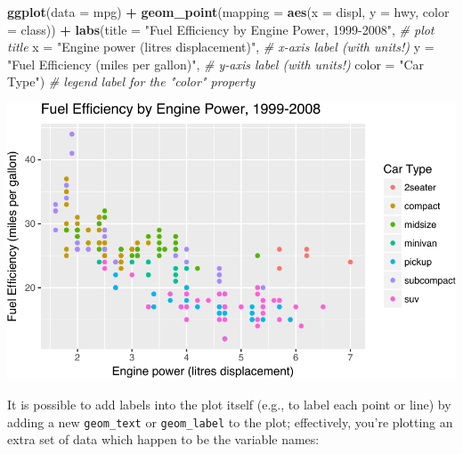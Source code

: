\documentclass[]{book}
\newenvironment{Shaded}{\begin{snugshade}}{\end{snugshade}}
\newcommand{\KeywordTok}[1]{\textcolor[rgb]{0.13,0.29,0.53}{\textbf{#1}}}
\newcommand{\DataTypeTok}[1]{\textcolor[rgb]{0.13,0.29,0.53}{#1}}
\newcommand{\StringTok}[1]{\textcolor[rgb]{0.31,0.60,0.02}{#1}}
\newcommand{\CommentTok}[1]{\textcolor[rgb]{0.56,0.35,0.01}{\textit{#1}}}
\newcommand{\OperatorTok}[1]{\textcolor[rgb]{0.81,0.36,0.00}{\textbf{#1}}}
\newcommand{\NormalTok}[1]{#1}
\theoremstyle{definition}
\theoremstyle{definition}
\theoremstyle{remark}
\begin{document}
\begin{Shaded}
\begin{Highlighting}[]
\KeywordTok{ggplot}\NormalTok{(}\DataTypeTok{data =}\NormalTok{ mpg) }\OperatorTok{+}
\StringTok{  }\KeywordTok{geom_point}\NormalTok{(}\DataTypeTok{mapping =} \KeywordTok{aes}\NormalTok{(}\DataTypeTok{x =}\NormalTok{ displ, }\DataTypeTok{y =}\NormalTok{ hwy, }\DataTypeTok{color =}\NormalTok{ class)) }\OperatorTok{+}
\StringTok{  }\KeywordTok{labs}\NormalTok{(}\DataTypeTok{title =} \StringTok{"Fuel Efficiency by Engine Power, 1999-2008"}\NormalTok{,  }\CommentTok{# plot title}
       \DataTypeTok{x =} \StringTok{"Engine power (litres displacement)"}\NormalTok{,  }\CommentTok{# x-axis label (with units!)}
       \DataTypeTok{y =} \StringTok{"Fuel Efficiency (miles per gallon)"}\NormalTok{,  }\CommentTok{# y-axis label (with units!)}
       \DataTypeTok{color =} \StringTok{"Car Type"}\NormalTok{)  }\CommentTok{# legend label for the "color" property}
\end{Highlighting}
\end{Shaded}

\includegraphics{img/ggplot2/labels-1.pdf}

It is possible to add labels into the plot itself (e.g., to label each
point or line) by adding a new \texttt{geom\_text} or
\texttt{geom\_label} to the plot; effectively, you're plotting an extra
set of data which happen to be the variable names:
\end{document}
